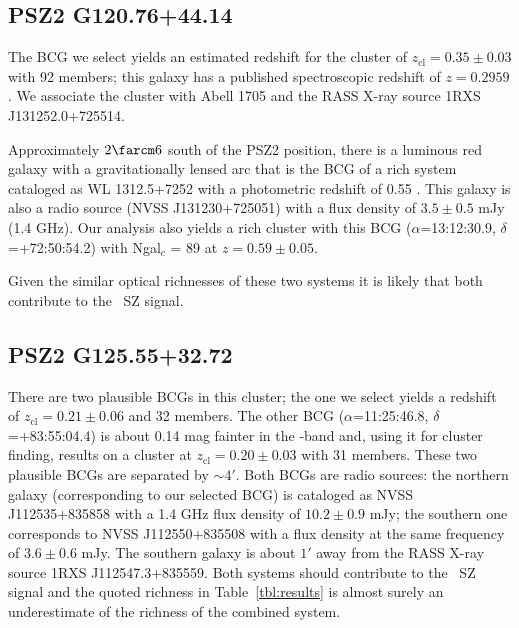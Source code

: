 \documentclass[apj, revtex4-1]{emulateapj}
\newcommand{\editorial}[1]{\textcolor{red}{#1}}
\begin{document}
\subsection{PSZ2 G120.76+44.14} %
The BCG we select yields an estimated redshift for the cluster of $z_\mathrm{cl} = 0.35 \pm 0.03$ with 92 members; this galaxy has a published spectroscopic redshift of $z=0.2959$ \citep{Huchra1990}. We associate the cluster with Abell 1705 and the RASS X-ray source 1RXS J131252.0+725514.

Approximately $2\farcm6$ south of the PSZ2 position, there is a luminous red galaxy with a gravitationally lensed arc that is the BCG of a rich system cataloged as WL 1312.5+7252 with a photometric redshift of 0.55 \citep{Dahle2003}. This galaxy is also a radio source (NVSS J131230+725051) with a flux density of $3.5 \pm 0.5$ mJy (1.4 GHz). Our analysis also yields a rich cluster with this BCG ($\alpha$=13:12:30.9, $\delta$=+72:50:54.2) with Ngal$_c$ = 89 at $z=0.59 \pm 0.05$.

Given the similar optical richnesses of these two systems it is likely that both contribute to the \planck\ SZ signal.

\subsection{PSZ2 G125.55+32.72} %
There are two plausible BCGs in this cluster; the one we select yields a redshift of $z_\mathrm{cl} = 0.21 \pm 0.06$ and 32 members. The other BCG ($\alpha$=11:25:46.8, $\delta$=+83:55:04.4) is about 0.14 mag fainter in the \sdssi-band and, using it for cluster finding, results on a cluster at $z_\mathrm{cl} = 0.20 \pm 0.03$ with 31 members. These two plausible BCGs are separated by $\sim4'$. Both BCGs are radio sources: the northern galaxy (corresponding to our selected BCG) is cataloged as NVSS J112535+835858 with a 1.4 GHz flux density of $10.2 \pm 0.9$ mJy; the southern one corresponds to NVSS J112550+835508 with a flux density at the same frequency of $3.6 \pm 0.6$ mJy. The southern galaxy is about $1'$ away from the RASS X-ray source 1RXS J112547.3+835559. Both systems should contribute to the \planck\ SZ signal and the quoted richness in Table~\ref{tbl:results} is almost surely an underestimate of the richness of the combined system.
\end{document}

